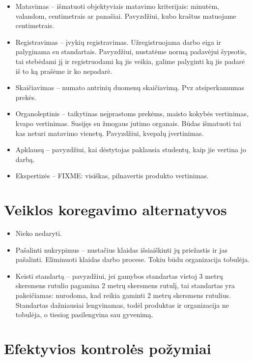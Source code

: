 \begin{itemize}
  \item Matavimas – išmatuoti objektyviais matavimo kriterijais: minutėm,
    valandom, centimetrais ar panašiai. Pavyzdžiui, kubo kraštus matuojame
    centimetrais.
  \item Registravimas – įvykių registravimas. Užregistruojama darbo
    eiga ir palyginama su standartais. Pavyzdžiui, nustatėme normą padavėjui
    šypsotis, tai stebėdami jį ir registruodami ką jis veikia, galime
    palyginti ką jis padarė iš to ką prašėme ir ko nepadarė.
  \item Skaičiavimas – numato antrinių duomenų skaičiavimą. Pvz
    atsiperkamumas prekės.
  \item Organoleptinis – taikytinas neįprastoms prekėms, maisto
    kokybės vertinimas, kvapo vertinimas. Susijęs su žmogaus jutimo
    organais. Būdas išmatuoti tai kas neturi matavimo vienetų. Pavyzdžiui,
    kvepalų įvertinimas.
  \item Apklausų – pavyzdžiui, kai dėstytojas paklausia studentų, kaip
    jie vertina jo darbą.
  \item Ekspertizės – FIXME: visiškas, pilnavertis produkto vertinimas.
\end{itemize}

\section{Veiklos koregavimo alternatyvos}

\begin{itemize}
  \item Nieko nedaryti.
  \item Pašalinti nukrypimus – nustačius klaidas išsiaiškinti jų priežastis
    ir jas pašalinti. Eliminuoti klaidas darbo procese. Tokiu būdu
    organizacija tobulėja.
  \item Keisti standartą – pavyzdžiui, jei gamybos standartas vietoj
    3 metrų skersmens rutulio pagamina 2 metrų skersmens rutulį, tai
    standartas yra pakeičiamas: nurodoma, kad reikia gaminti 2 metrų
    skersmens rutulius. Standartas dažniausiai lengvinamas, todėl
    produktas ir organizacija ne tobulėja, o tiesiog pasilengvina sau
    gyvenimą.
\end{itemize}

\section{Efektyvios kontrolės požymiai}

